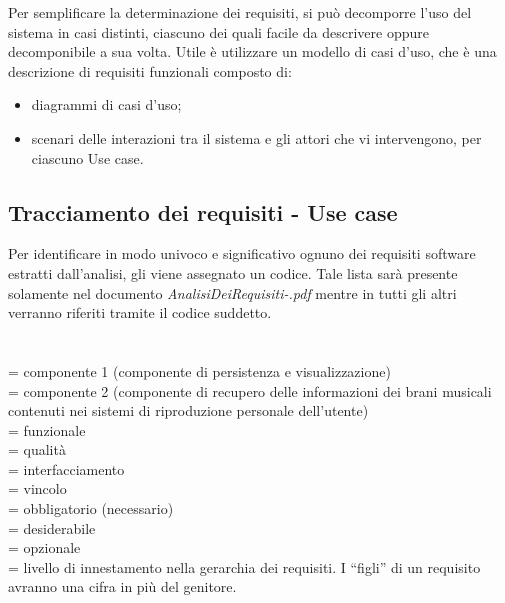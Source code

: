 Per semplificare la determinazione dei requisiti, si pu\`o decomporre l'uso
del sistema in casi distinti, ciascuno dei quali facile da
descrivere oppure decomponibile a sua volta.
Utile \`e utilizzare un modello di casi d'uso, che \`e una descrizione di
requisiti funzionali composto di:
\begin{itemize}
  \item diagrammi di casi d'uso;
  \item scenari delle interazioni tra il sistema e gli attori che vi
  intervengono, per ciascuno Use case.
\end{itemize}

\subsection{Tracciamento dei requisiti - Use case}
Per identificare in modo univoco e significativo ognuno dei requisiti software
estratti dall'analisi, gli viene assegnato un codice.
Tale lista sar\`a presente solamente nel documento
\emph{AnalisiDeiRequisiti-\versioneAR.pdf} mentre in tutti gli altri verranno
riferiti tramite il codice suddetto.
\\
\\
\\
 = componente 1 (componente di persistenza e visualizzazione)\\
 = componente 2 (componente di recupero delle informazioni dei brani
musicali contenuti nei sistemi di riproduzione personale dell'utente)\\
 = funzionale\\
 = qualit\`a\\
 = interfacciamento\\
 = vincolo\\
 = obbligatorio (necessario)\\
 = desiderabile\\
 = opzionale\\
 = livello di innestamento nella gerarchia dei requisiti. I ``figli'' di
un requisito avranno una cifra in pi\`u del genitore.


\newpage
